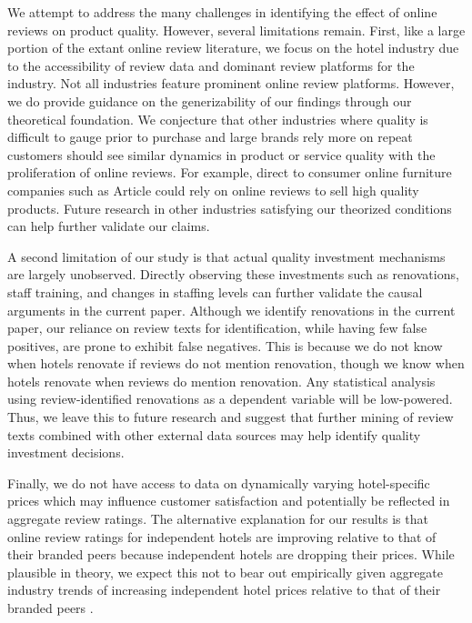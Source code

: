 \documentclass{informs_mod} %
\begin{document}
We attempt to address the many challenges in identifying the effect of online reviews on product quality. However, several limitations remain. First, like a large portion of the extant online review literature, we focus on the hotel industry due to the accessibility of review data and dominant review platforms for the industry. Not all industries feature prominent online review platforms. However, we do provide guidance on the generizability of our findings through our theoretical foundation. We conjecture that  other industries where quality is difficult to gauge prior to purchase and large brands rely more on repeat customers should see similar dynamics in product or service quality with the proliferation of online reviews. For example, direct to consumer online furniture companies such as Article could rely on online reviews to sell high quality products. Future research in other industries satisfying our theorized conditions can help further validate our claims. 

A second limitation of our study is that actual quality investment mechanisms are largely unobserved. Directly observing these investments such as renovations, staff training, and changes in staffing levels can further validate the causal arguments in the current paper. Although we identify renovations in the current paper, our reliance on review texts for identification, while having few false positives, are prone to exhibit false negatives. This is because we do not know when hotels renovate if reviews do not mention renovation, though we know when hotels renovate when reviews do mention renovation. Any statistical analysis using review-identified renovations as a dependent variable will be low-powered. Thus, we leave this to future research and suggest that further mining of review texts combined with other external data sources may help identify quality investment decisions.

Finally, we do not have access to data on dynamically varying hotel-specific prices which may influence customer satisfaction and potentially be reflected in aggregate review ratings. The alternative explanation for our results is that online review ratings for independent hotels are improving relative to that of their branded peers because independent hotels are dropping their prices. While plausible in theory, we expect this not to bear out empirically given aggregate industry trends of increasing independent hotel prices relative to that of their branded peers .

\clearpage
\end{document}
